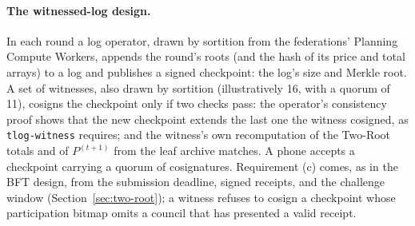 \documentclass[10pt,twoside,openany]{book}
\theoremstyle{dpepstyle}
\begin{document}
\paragraph{The witnessed-log design.} In each round a log operator, drawn by sortition from the federations' Planning Compute Workers, appends the round's roots (and the hash of its price and total arrays) to a log and publishes a signed checkpoint: the log's size and Merkle root. A set of witnesses, also drawn by sortition (illustratively 16, with a quorum of 11), cosigns the checkpoint only if two checks pass: the operator's consistency proof shows that the new checkpoint extends the last one the witness cosigned, as \texttt{tlog-witness} requires; and the witness's own recomputation of the Two-Root totals and of $P^{(t+1)}$ from the leaf archive matches. A phone accepts a checkpoint carrying a quorum of cosignatures. Requirement (c) comes, as in the BFT design, from the submission deadline, signed receipts, and the challenge window (Section~\ref{sec:two-root}); a witness refuses to cosign a checkpoint whose participation bitmap omits a council that has presented a valid receipt.
\end{document}
